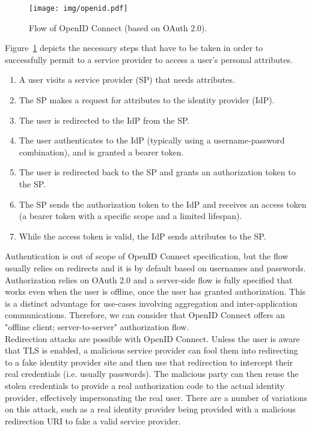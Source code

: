 \begin{figure}[htbp]
  \begin{center}
    \texttt{[image: img/openid.pdf]}
        \caption{Flow of OpenID Connect (based on OAuth 2.0).}
        \label{fig:openid-flow}
  \end{center}
\end{figure}

Figure~\ref{fig:openid-flow} depicts the necessary steps that have to be taken in order to successfully permit to a service provider to access a user's personal attributes.

\begin{enumerate}
\item A user visits a service provider (SP) that needs attributes.
\item The SP makes a request for attributes to the identity provider (IdP).
\item The user is redirected to the IdP from the SP.
\item The user authenticates to the IdP (typically using a username-password combination), and is granted a bearer token.
\item The user is redirected back to the SP and grants an authorization token to the SP.
\item The SP sends the authorization token to the IdP and receives an access token (a bearer token with a specific scope and a limited lifespan).
\item While the access token is valid, the IdP sends attributes to the SP.
\end{enumerate}

Authentication is out of scope of OpenID Connect specification, but the flow usually relies on redirects and it is by default based on usernames and passwords. Authorization relies on OAuth 2.0 and a server-side flow is fully specified that works even when the user is offline, once the user has granted authorization. This is a distinct advantage for use-cases involving aggregation and inter-application communications. Therefore, we can consider that OpenID Connect offers an "offline client; server-to-server" authorization flow.\\

Redirection attacks are possible with OpenID Connect. Unless the user is aware that TLS is enabled, a malicious service provider can fool them into redirecting to a fake identity provider site and then use that redirection to intercept their real credentials (i.e. usually passwords). The malicious party can then reuse the stolen credentials to provide a real authorization code to the actual identity provider, effectively impersonating the real user. There are a number of variations on this attack, such as a real identity provider being provided with a malicious redirection URI to fake a valid service provider.\\

